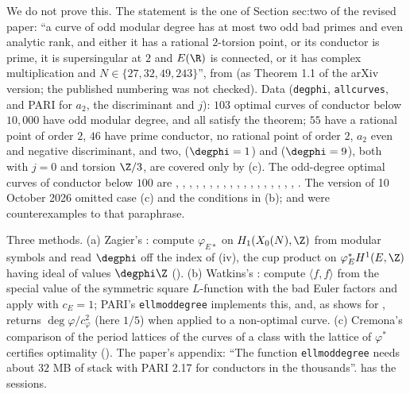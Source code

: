 We do not prove this. The statement is the one of Section sec:two of the revised paper: ``a curve of odd modular degree has at most two odd bad primes and even analytic rank, and either it has a
rational $2$-torsion point, or its conductor is prime, it is supersingular at $2$ and $E(\R)$ is connected, or it has complex multiplication and $N\in\{27,32,49,243\}$'', from
\cite{CalegariEmerton09} (as Theorem 1.1 of the arXiv version; the published numbering was not checked). Data (\texttt{degphi}, \texttt{allcurves}, and PARI for $a_2$, the discriminant and $j$): $103$
optimal curves of conductor below $10{,}000$ have odd modular degree, and all satisfy the theorem; $55$ have a rational point of order $2$, $46$ have prime conductor, no rational point of order $2$,
$a_2$ even and negative discriminant, and two,  ($\degphi=1$) and  ($\degphi=9$), both with $j=0$ and torsion $\Z/3$, are covered only by (c). The odd-degree optimal curves of
conductor below $100$ are , , , , , , , , , , , , , ,
, , , , . The version of 10 October 2026 omitted case (c) and the conditions in (b);  and  were counterexamples to that
paraphrase.

\begin{remark}\label{rem:moddeg:computing-the-degree}
Three methods. (a) Zagier's \cite{Zagier85}: compute $\varphi_{E*}$ on $H_1(X_0(N),\Z)$ from modular symbols and read $\degphi$ off the index of (iv), the cup product
on $\varphi_E^*H^1(E,\Z)$ having ideal of values $\degphi\Z$ (\cite[Chapter II]{Cremona97}). (b) Watkins's \cite{Watkins02}: compute $\langle f,f\rangle$ from the special value of the symmetric square $L$-function
with the bad Euler factors and apply  with $c_E=1$; PARI's \texttt{ellmoddegree} implements this, and, as  shows for , returns
$\deg\varphi/c_\varphi^2$ (here $1/5$) when applied to a non-optimal curve. (c) Cremona's comparison of the period lattices of the curves of a class with the lattice of $\varphi^*$ certifies optimality
(). The paper's appendix: ``The function \texttt{ellmoddegree} needs about $32$ MB of stack with PARI 2.17 for conductors in the thousands''. 
has the sessions.
\end{remark}

